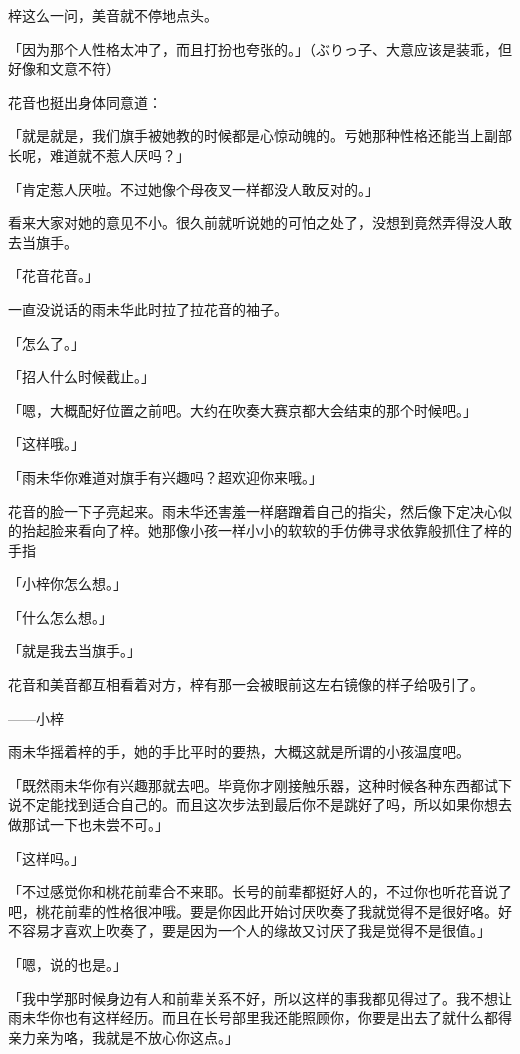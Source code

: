 \documentclass[UTF8]{ctexart}
\begin{document}
    梓这么一问，美音就不停地点头。

    「因为那个人性格太冲了，而且打扮也夸张的。」（ぶりっ子、大意应该是装乖，但好像和文意不符）

    花音也挺出身体同意道：

    「就是就是，我们旗手被她教的时候都是心惊动魄的。亏她那种性格还能当上副部长呢，难道就不惹人厌吗？」

    「肯定惹人厌啦。不过她像个母夜叉一样都没人敢反对的。」

    看来大家对她的意见不小。很久前就听说她的可怕之处了，没想到竟然弄得没人敢去当旗手。

    「花音花音。」

    一直没说话的雨未华此时拉了拉花音的袖子。

    「怎么了。」

    「招人什么时候截止。」

    「嗯，大概配好位置之前吧。大约在吹奏大赛京都大会结束的那个时候吧。」

    「这样哦。」

    「雨未华你难道对旗手有兴趣吗？超欢迎你来哦。」

    花音的脸一下子亮起来。雨未华还害羞一样磨蹭着自己的指尖，然后像下定决心似的抬起脸来看向了梓。她那像小孩一样小小的软软的手仿佛寻求依靠般抓住了梓的手指

    「小梓你怎么想。」

    「什么怎么想。」

    「就是我去当旗手。」

    花音和美音都互相看着对方，梓有那一会被眼前这左右镜像的样子给吸引了。

    ——小梓

    雨未华摇着梓的手，她的手比平时的要热，大概这就是所谓的小孩温度吧。

    「既然雨未华你有兴趣那就去吧。毕竟你才刚接触乐器，这种时候各种东西都试下说不定能找到适合自己的。而且这次步法到最后你不是跳好了吗，所以如果你想去做那试一下也未尝不可。」

    「这样吗。」

    「不过感觉你和桃花前辈合不来耶。长号的前辈都挺好人的，不过你也听花音说了吧，桃花前辈的性格很冲哦。要是你因此开始讨厌吹奏了我就觉得不是很好咯。好不容易才喜欢上吹奏了，要是因为一个人的缘故又讨厌了我是觉得不是很值。」

    「嗯，说的也是。」

    「我中学那时候身边有人和前辈关系不好，所以这样的事我都见得过了。我不想让雨未华你也有这样经历。而且在长号部里我还能照顾你，你要是出去了就什么都得亲力亲为咯，我就是不放心你这点。」
\end{document}
